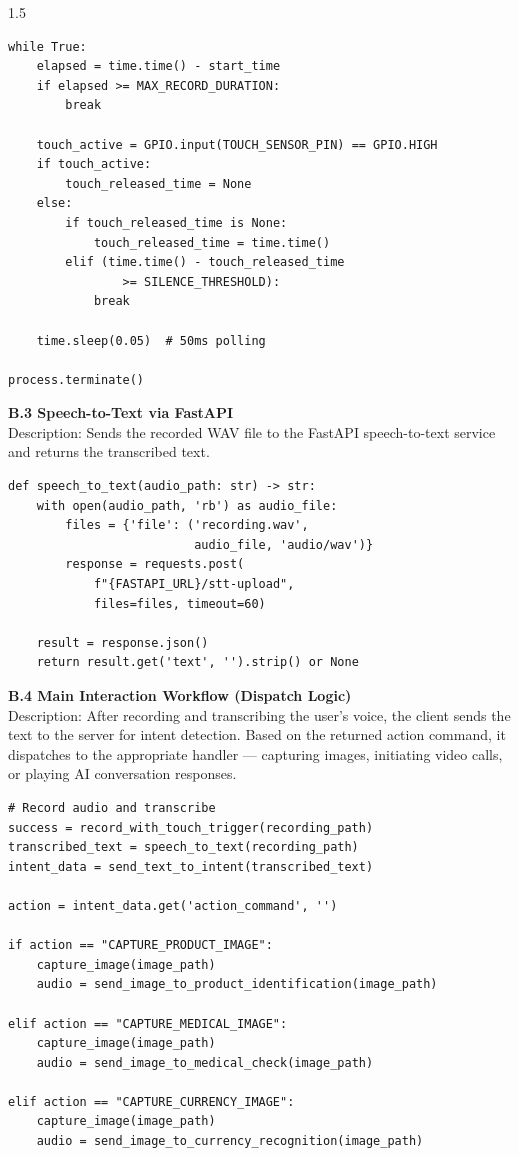 \begin{spacing}{1.5}
\begin{verbatim}
while True:
    elapsed = time.time() - start_time
    if elapsed >= MAX_RECORD_DURATION:
        break

    touch_active = GPIO.input(TOUCH_SENSOR_PIN) == GPIO.HIGH
    if touch_active:
        touch_released_time = None
    else:
        if touch_released_time is None:
            touch_released_time = time.time()
        elif (time.time() - touch_released_time
                >= SILENCE_THRESHOLD):
            break

    time.sleep(0.05)  # 50ms polling

process.terminate()
\end{verbatim}

\noindent \textbf{B.3 Speech-to-Text via FastAPI}\\
Description: Sends the recorded WAV file to the FastAPI speech-to-text service and returns the transcribed text.
\begin{verbatim}
def speech_to_text(audio_path: str) -> str:
    with open(audio_path, 'rb') as audio_file:
        files = {'file': ('recording.wav',
                          audio_file, 'audio/wav')}
        response = requests.post(
            f"{FASTAPI_URL}/stt-upload",
            files=files, timeout=60)

    result = response.json()
    return result.get('text', '').strip() or None
\end{verbatim}
\thispagestyle{empty}
\noindent \textbf{B.4 Main Interaction Workflow (Dispatch Logic)}\\
Description: After recording and transcribing the user's voice, the client sends the text to the server for intent detection. Based on the returned action command, it dispatches to the appropriate handler --- capturing images, initiating video calls, or playing AI conversation responses.
\begin{verbatim}
# Record audio and transcribe
success = record_with_touch_trigger(recording_path)
transcribed_text = speech_to_text(recording_path)
intent_data = send_text_to_intent(transcribed_text)

action = intent_data.get('action_command', '')

if action == "CAPTURE_PRODUCT_IMAGE":
    capture_image(image_path)
    audio = send_image_to_product_identification(image_path)

elif action == "CAPTURE_MEDICAL_IMAGE":
    capture_image(image_path)
    audio = send_image_to_medical_check(image_path)

elif action == "CAPTURE_CURRENCY_IMAGE":
    capture_image(image_path)
    audio = send_image_to_currency_recognition(image_path)


\end{verbatim}
\end{spacing}
